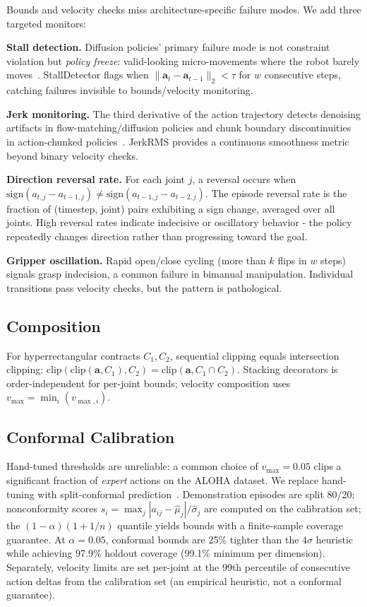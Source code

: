 \documentclass[conference]{IEEEtran}
\begin{document}
Bounds and velocity checks miss architecture-specific failure modes.
We add three targeted monitors:

\noindent\textbf{Stall detection.}
Diffusion policies' primary failure mode is not constraint violation but \emph{policy freeze}: valid-looking micro-movements where the robot barely moves~\cite{safe2025}.
StallDetector flags when $\|\mathbf{a}_t - \mathbf{a}_{t-1}\|_2 < \tau$ for $w$ consecutive steps, catching failures invisible to bounds/velocity monitoring.

\noindent\textbf{Jerk monitoring.}
The third derivative of the action trajectory detects denoising artifacts in flow-matching/diffusion policies and chunk boundary discontinuities in action-chunked policies~\cite{acg2025}.
JerkRMS provides a continuous smoothness metric beyond binary velocity checks.

\noindent\textbf{Direction reversal rate.}
For each joint $j$, a reversal occurs when $\text{sign}(a_{t,j} - a_{t-1,j}) \neq \text{sign}(a_{t-1,j} - a_{t-2,j})$.
The episode reversal rate is the fraction of (timestep, joint) pairs exhibiting a sign change, averaged over all joints.
High reversal rates indicate indecisive or oscillatory behavior - the policy repeatedly changes direction rather than progressing toward the goal.

\noindent\textbf{Gripper oscillation.}
Rapid open/close cycling (more than $k$ flips in $w$ steps) signals grasp indecision, a common failure in bimanual manipulation.
Individual transitions pass velocity checks, but the pattern is pathological.

\subsection{Composition}

For hyperrectangular contracts $C_1, C_2$, sequential clipping equals intersection clipping:
$\text{clip}(\text{clip}(\mathbf{a}, C_1), C_2) = \text{clip}(\mathbf{a}, C_1 \cap C_2)$.
Stacking decorators is order-independent for per-joint bounds; velocity composition uses $v_{\max} = \min_i(v_{\max,i})$.

\subsection{Conformal Calibration}
\label{sec:calibration}

Hand-tuned thresholds are unreliable: a common choice of $v_{\max}{=}0.05$ clips a significant fraction of \emph{expert} actions on the ALOHA dataset.
We replace hand-tuning with split-conformal prediction~\cite{vovk2005}.
Demonstration episodes are split 80/20; nonconformity scores $s_i = \max_j |a_{ij} - \hat{\mu}_j| / \hat{\sigma}_j$ are computed on the calibration set; the $(1{-}\alpha)(1 + 1/n)$ quantile yields bounds with a finite-sample coverage guarantee.
At $\alpha{=}0.05$, conformal bounds are 25\% tighter than the 4$\sigma$ heuristic while achieving 97.9\% holdout coverage (99.1\% minimum per dimension).
Separately, velocity limits are set per-joint at the 99th percentile of consecutive action deltas from the calibration set (an empirical heuristic, not a conformal guarantee).
\end{document}
